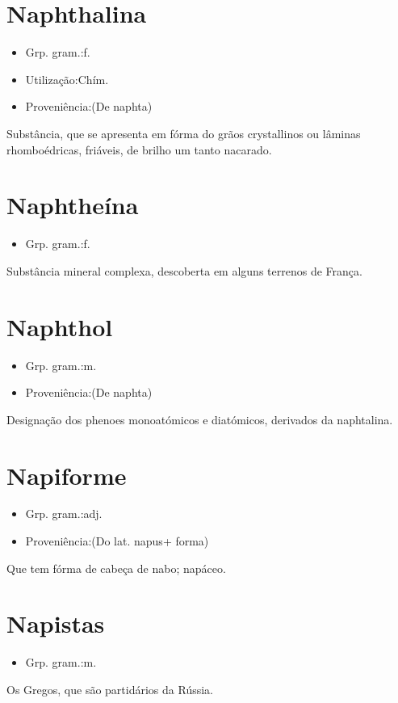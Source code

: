 \section{Naphthalina}
\begin{itemize}
\item {Grp. gram.:f.}
\end{itemize}
\begin{itemize}
\item {Utilização:Chím.}
\end{itemize}
\begin{itemize}
\item {Proveniência:(De \textunderscore naphta\textunderscore )}
\end{itemize}
Substância, que se apresenta em fórma do grãos crystallinos ou lâminas rhomboédricas, friáveis, de brilho um tanto nacarado.
\section{Naphtheína}
\begin{itemize}
\item {Grp. gram.:f.}
\end{itemize}
Substância mineral complexa, descoberta em alguns terrenos de França.
\section{Naphthol}
\begin{itemize}
\item {Grp. gram.:m.}
\end{itemize}
\begin{itemize}
\item {Proveniência:(De \textunderscore naphta\textunderscore )}
\end{itemize}
Designação dos phenoes monoatómicos e diatómicos, derivados da naphtalina.
\section{Napiforme}
\begin{itemize}
\item {Grp. gram.:adj.}
\end{itemize}
\begin{itemize}
\item {Proveniência:(Do lat. \textunderscore napus\textunderscore  + \textunderscore forma\textunderscore )}
\end{itemize}
Que tem fórma de cabeça de nabo; napáceo.
\section{Napistas}
\begin{itemize}
\item {Grp. gram.:m.}
\end{itemize}
Os Gregos, que são partidários da Rússia.
